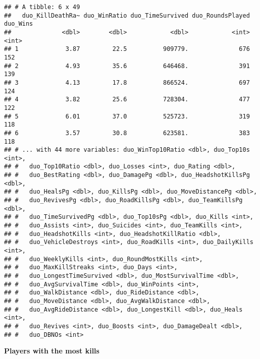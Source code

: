\documentclass[]{article}
\begin{document}
\begin{verbatim}
## # A tibble: 6 x 49
##   duo_KillDeathRa~ duo_WinRatio duo_TimeSurvived duo_RoundsPlayed duo_Wins
##              <dbl>        <dbl>            <dbl>            <int>    <int>
## 1             3.87         22.5          909779.              676      152
## 2             4.93         35.6          646468.              391      139
## 3             4.13         17.8          866524.              697      124
## 4             3.82         25.6          728304.              477      122
## 5             6.01         37.0          525723.              319      118
## 6             3.57         30.8          623581.              383      118
## # ... with 44 more variables: duo_WinTop10Ratio <dbl>, duo_Top10s <int>,
## #   duo_Top10Ratio <dbl>, duo_Losses <int>, duo_Rating <dbl>,
## #   duo_BestRating <dbl>, duo_DamagePg <dbl>, duo_HeadshotKillsPg <dbl>,
## #   duo_HealsPg <dbl>, duo_KillsPg <dbl>, duo_MoveDistancePg <dbl>,
## #   duo_RevivesPg <dbl>, duo_RoadKillsPg <dbl>, duo_TeamKillsPg <dbl>,
## #   duo_TimeSurvivedPg <dbl>, duo_Top10sPg <dbl>, duo_Kills <int>,
## #   duo_Assists <int>, duo_Suicides <int>, duo_TeamKills <int>,
## #   duo_HeadshotKills <int>, duo_HeadshotKillRatio <dbl>,
## #   duo_VehicleDestroys <int>, duo_RoadKills <int>, duo_DailyKills <int>,
## #   duo_WeeklyKills <int>, duo_RoundMostKills <int>,
## #   duo_MaxKillStreaks <int>, duo_Days <int>,
## #   duo_LongestTimeSurvived <dbl>, duo_MostSurvivalTime <dbl>,
## #   duo_AvgSurvivalTime <dbl>, duo_WinPoints <int>,
## #   duo_WalkDistance <dbl>, duo_RideDistance <dbl>,
## #   duo_MoveDistance <dbl>, duo_AvgWalkDistance <dbl>,
## #   duo_AvgRideDistance <dbl>, duo_LongestKill <dbl>, duo_Heals <int>,
## #   duo_Revives <int>, duo_Boosts <int>, duo_DamageDealt <dbl>,
## #   duo_DBNOs <int>
\end{verbatim}

\textbf{Players with the most kills}
\end{document}
